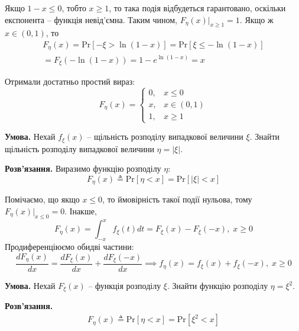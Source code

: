 \documentclass[oneside,solution]{karazin-prob-theory-assign}
\begin{document}
Якщо $1-x \leq 0$, тобто $x \geq 1$, то така подія відбудеться гарантовано, оскільки експонента -- функція невід'ємна. Таким чином, $F_{\eta}(x)\Big|_{x \geq 1} = 1$. Якщо ж $x \in (0,1)$, то
\begin{align}
    F_{\eta}(x) = \text{Pr}[-\xi > \ln(1-x)] = \text{Pr}[\xi \leq -\ln(1-x)]\nonumber \\ = F_{\xi}(-\ln (1-x)) = 1 - e^{\ln (1-x)} = x
\end{align}

Отримали достатньо простий вираз:
\begin{equation}
    \boxed{
        F_{\eta}(x) = \begin{cases}
            0, & x \leq 0 \\
            x, & x \in (0,1) \\
            1, & x \geq 1
        \end{cases}
    }
\end{equation}


\hspace{20px}\textbf{Умова.} Нехай $f_{\xi}(x)$ -- щільність розподілу випадкової величини $\xi$. Знайти щільність розподілу випадкової величини $\eta=|\xi|$.

\textbf{Розв'язання.} Виразимо функцію розподілу $\eta$:
\begin{equation}
    F_{\eta}(x) \triangleq \text{Pr}[\eta < x] = \text{Pr}[|\xi| < x]
\end{equation}

Помічаємо, що якщо $x\leq 0$, то ймовірність такої події нульова, тому $F_{\eta}(x)\Big|_{x \leq 0} = 0$. Інакше,
\begin{equation}
    F_{\eta}(x) = \int_{-x}^x f_{\xi}(t)dt = F_{\xi}(x) - F_{\xi}(-x), \; x \geq 0
\end{equation}
Продиференціюємо обидві частини:
\begin{equation}
    \frac{dF_{\eta}(x)}{dx} = \frac{dF_{\xi}(x)}{dx} + \frac{dF_{\xi}(-x)}{dx} \implies \boxed{f_{\eta}(x) = f_{\xi}(x) + f_{\xi}(-x), \; x \geq 0}
\end{equation}


\hspace{20px}\textbf{Умова.} Нехай $F_{\xi}(x)$ -- функція розподілу $\xi$. Знайти функцію розподілу $\eta=\xi^2$.

\textbf{Розв'язання.}
\begin{align}
    F_{\eta}(x) \triangleq \text{Pr}[\eta < x] = \text{Pr}[\xi^2 < x]
\end{align}
\end{document}
